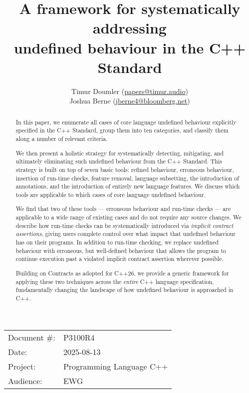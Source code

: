 

\title{A framework for systematically addressing \\ undefined behaviour in the C++ Standard} 
\author{ Timur Doumler \small(\href{mailto:papers@timur.audio}{papers@timur.audio}) 
\\ Joshua Berne \small(\href{mailto:jberne4@bloomberg.net}{jberne4@bloomberg.net})  
}
\date{}
\maketitle

\begin{tabular}{ll}
Document \#: & P3100R4 \\
Date: &2025-08-13 \\
Project: & Programming Language C++ \\
Audience: & EWG
\end{tabular}

\begin{abstract}
In this paper, we enumerate all cases of core language undefined behaviour explicitly specified in the C++ Standard,  group them into ten categories, and classify them along a number of relevant criteria.

We then present a holistic strategy for systematically detecting, mitigating, and ultimately eliminating such undefined behaviour from the C++ Standard. This strategy is built on top of seven basic tools: refined behaviour, erroneous behaviour, insertion of run-time checks, feature removal, language subsetting, the introduction of annotations, and the introduction of entirely new language features. We discuss which tools are applicable to which cases of core language undefined behaviour.

We find that two of these tools --- erroneous behaviour and run-time checks --- are applicable to a wide range of existing cases and do not require any source changes. We describe how run-time
checks can be systematically introduced via \emph{implicit contract assertions}, giving users complete
control over what impact that undefined behaviour has on their programs. In addition to run-time
checking, we replace undefined behaviour with erroneous, but well-defined behaviour that allows the program to continue execution past a violated implicit contract assertion wherever possible.

Building on Contracts as adopted for C++26, we provide a generic framework for applying these two techniques across the \emph{entire} C++ language specification, fundamentally changing the landscape of how undefined behaviour is approached in C++.
\end{abstract}


